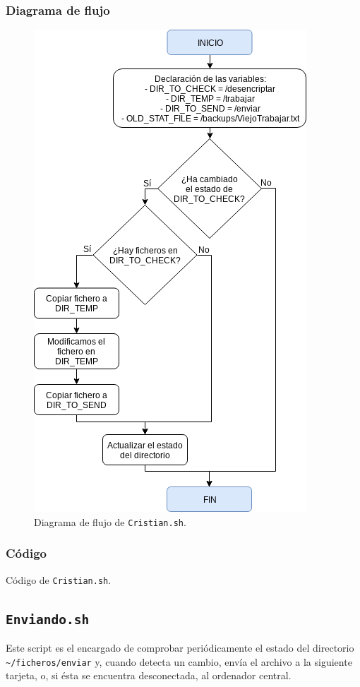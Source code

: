 \subsubsection{Diagrama de flujo}
\begin{figure}[h]
	\centering
	\includegraphics[scale=0.7]{Anexos/Anexo3/Diagramas/Cristian.png}
	\caption{Diagrama de flujo de \texttt{Cristian.sh}.}
	\label{Diagrama de flujo de Cristian.sh}
\end{figure}

\newpage
\subsubsection{Código}

\begin{center}
	Código de \texttt{Cristian.sh}.
\end{center}

\newpage
\subsection{\texttt{Enviando.sh}}
Este script es el encargado de comprobar periódicamente el estado del directorio\\ \texttt{\textasciitilde/ficheros/enviar} y, cuando detecta un cambio, envía el archivo a la siguiente tarjeta, o, si ésta se encuentra desconectada, al ordenador central.


